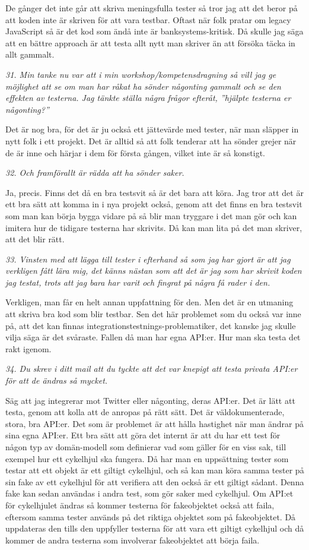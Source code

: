 \documentclass[11pt]{article}
\begin{document}
De gånger det inte går att skriva meningsfulla tester så tror jag att det beror på att koden inte är skriven för att vara testbar. Oftast när folk pratar om legacy JavaScript så är det kod som ändå inte är banksystems-kritisk. Då skulle jag säga att en bättre approach är att testa allt nytt man skriver än att försöka täcka in allt gammalt.

\emph{31. Min tanke nu var att i min workshop/kompetensdragning så vill jag ge möjlighet att se om man har råkat ha sönder någonting gammalt och se den effekten av testerna. Jag tänkte ställa några frågor efteråt, ”hjälpte testerna er någonting?”}

Det är nog bra, för det är ju också ett jättevärde med tester, när man släpper in nytt folk i ett projekt. Det är alltid så att folk tenderar att ha sönder grejer när de är inne och härjar i dem för första gången, vilket inte är så konstigt.

\emph{32. Och framförallt är rädda att ha sönder saker.}

Ja, precis. Finns det då en bra testsvit så är det bara att köra. Jag tror att det är ett bra sätt att komma in i nya projekt också, genom att det finns en bra testsvit som man kan börja bygga vidare på så blir man tryggare i det man gör och kan imitera hur de tidigare testerna har skrivits. Då kan man lita på det man skriver, att det blir rätt.

\emph{33. Vinsten med att lägga till tester i efterhand så som jag har gjort är att jag verkligen fått lära mig, det känns nästan som att det är jag som har skrivit koden jag testat, trots att jag bara har varit och fingrat på några få rader i den.}

Verkligen, man får en helt annan uppfattning för den. Men det är en utmaning att skriva bra kod som blir testbar. Sen det här problemet som du också var inne på, att det kan finnas integrationstestnings-problematiker, det kanske jag skulle vilja säga är det svåraste. Fallen då man har egna API:er. Hur man ska testa det rakt igenom.

\emph{34. Du skrev i ditt mail att du tyckte att det var knepigt att testa privata API:er för att de ändras så mycket.}

Säg att jag integrerar mot Twitter eller någonting, deras API:er. Det är lätt att testa, genom att kolla att de anropas på rätt sätt. Det är väldokumenterade, stora, bra API:er. Det som är problemet är att hålla hastighet när man ändrar på sina egna API:er. Ett bra sätt att göra det internt är att du har ett test för någon typ av domän-modell som definierar vad som gäller för en viss sak, till exempel hur ett cykelhjul ska fungera. Då har man en uppsättning tester som testar att ett objekt är ett giltigt cykelhjul, och så kan man köra samma tester på sin fake av ett cykelhjul för att verifiera att den också är ett giltigt sådant. Denna fake kan sedan användas i andra test, som gör saker med cykelhjul. Om API:et för cykelhjulet ändras så kommer testerna för fakeobjektet också att faila, eftersom samma tester används på det riktiga objektet som på fakeobjektet. Då uppdateras den tills den uppfyller testerna för att vara ett giltigt cykelhjul och då kommer de andra testerna som involverar fakeobjektet att börja faila.
\end{document}
